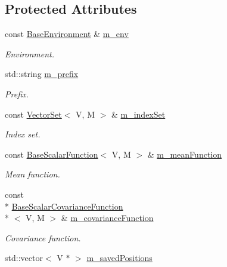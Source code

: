 \subsection*{Protected Attributes}
\begin{DoxyCompactItemize}
\item 
const \hyperlink{class_q_u_e_s_o_1_1_base_environment}{Base\-Environment} \& \hyperlink{class_q_u_e_s_o_1_1_scalar_gaussian_random_field_af1f041e02404457420e5b32dee70edc3}{m\-\_\-env}
\begin{DoxyCompactList}\small\item\em Environment. \end{DoxyCompactList}\item 
std\-::string \hyperlink{class_q_u_e_s_o_1_1_scalar_gaussian_random_field_a92b889ad0b3f05650afc60b3808af1b9}{m\-\_\-prefix}
\begin{DoxyCompactList}\small\item\em Prefix. \end{DoxyCompactList}\item 
const \hyperlink{class_q_u_e_s_o_1_1_vector_set}{Vector\-Set}$<$ V, M $>$ \& \hyperlink{class_q_u_e_s_o_1_1_scalar_gaussian_random_field_ada3f607cbe463fd3f735e33acca3f132}{m\-\_\-index\-Set}
\begin{DoxyCompactList}\small\item\em Index set. \end{DoxyCompactList}\item 
const \hyperlink{class_q_u_e_s_o_1_1_base_scalar_function}{Base\-Scalar\-Function}$<$ V, M $>$ \& \hyperlink{class_q_u_e_s_o_1_1_scalar_gaussian_random_field_a89e14e481690ccfa5536352018c7641f}{m\-\_\-mean\-Function}
\begin{DoxyCompactList}\small\item\em Mean function. \end{DoxyCompactList}\item 
const \\*
\hyperlink{class_q_u_e_s_o_1_1_base_scalar_covariance_function}{Base\-Scalar\-Covariance\-Function}\\*
$<$ V, M $>$ \& \hyperlink{class_q_u_e_s_o_1_1_scalar_gaussian_random_field_a7db273a4030d7bede05d9d4ef0efd043}{m\-\_\-covariance\-Function}
\begin{DoxyCompactList}\small\item\em Covariance function. \end{DoxyCompactList}\item 
std\-::vector$<$ V $\ast$ $>$ \hyperlink{class_q_u_e_s_o_1_1_scalar_gaussian_random_field_a5993884088927e1eb818cb8d473c5be8}{m\-\_\-saved\-Positions}

\end{DoxyCompactItemize}
